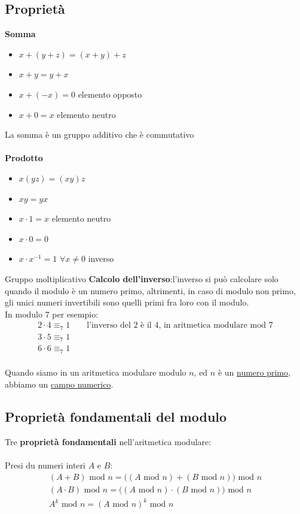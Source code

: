 \documentclass[italian]{article}
\newcommand{\mmod}{\text{ mod }}
\begin{document}
\subsection{Proprietà}
\textbf{Somma}
\begin{itemize}
	\item $x + (y+z) = (x+y) + z$
	\item $x+y=y+x$
	\item $x+(-x) = 0$ \qquad elemento opposto
	\item $x+0=x$ \qquad elemento neutro
\end{itemize}
La somma è un gruppo additivo che è commutativo\\\\
\textbf{Prodotto}
\begin{itemize}
	\item $x(yz) = (xy)z$
	\item $xy=yx$
	\item $x\cdot1 = x$ \qquad elemento neutro
	\item $x\cdot 0=0$
	\item $x\cdot x^{-1} = 1$ \qquad $\forall x \neq 0$ \qquad inverso
\end{itemize}
Gruppo moltiplicativo
\newpage
\noindent \textbf{Calcolo dell'inverso}:l'inverso si può calcolare solo quando il modulo è un numero primo, altrimenti, in caso di modulo non primo, gli unici numeri invertibili sono quelli primi fra loro con il modulo.\\
In modulo 7 per esempio:
\begin{gather*}
	2 \cdot 4 \equiv_7 1 \qquad \text{l'inverso del 2 è il 4, in aritmetica modulare mod 7}\\
	3 \cdot 5 \equiv_7 1\\
	6 \cdot 6 \equiv_7 1
\end{gather*}\\
Quando siamo in un aritmetica modulare modulo $n$, ed $n$ è un \underline{numero primo}, abbiamo un \underline{campo numerico}.

\subsection{Proprietà fondamentali del modulo}
Tre \textbf{proprietà fondamentali} nell'aritmetica modulare:\\\\
Presi du numeri interi $A$ e $B$:
\begin{gather*}
	(A+B) \mmod n = \big((A \mmod n) + (B \mmod n)\big) \mmod n \\
	(A\cdot B) \mmod n = \big((A \mmod n) \cdot (B \mmod n)\big) \mmod n \\
	A^k \mmod n = (A \mmod n)^k \mmod n
\end{gather*}
\end{document}
